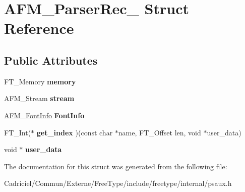 \hypertarget{struct_a_f_m___parser_rec__}{\section{A\-F\-M\-\_\-\-Parser\-Rec\-\_\- Struct Reference}
\label{struct_a_f_m___parser_rec__}
}
\subsection*{Public Attributes}
\begin{DoxyCompactItemize}
\item 
\hypertarget{struct_a_f_m___parser_rec___a3fec8b1760fa9261f48ee87dc2b3858b}{F\-T\-\_\-\-Memory {\bfseries memory}}\label{struct_a_f_m___parser_rec___a3fec8b1760fa9261f48ee87dc2b3858b}

\item 
\hypertarget{struct_a_f_m___parser_rec___adf3b1165216cbd1f7ec7ae736fd4270a}{A\-F\-M\-\_\-\-Stream {\bfseries stream}}\label{struct_a_f_m___parser_rec___adf3b1165216cbd1f7ec7ae736fd4270a}

\item 
\hypertarget{struct_a_f_m___parser_rec___ae53d6cddac32a0eb7014c3a9f74517df}{\hyperlink{struct_a_f_m___font_info_rec__}{A\-F\-M\-\_\-\-Font\-Info} {\bfseries Font\-Info}}\label{struct_a_f_m___parser_rec___ae53d6cddac32a0eb7014c3a9f74517df}

\item 
\hypertarget{struct_a_f_m___parser_rec___a5f93c5c83d0957c19d3827071d90926f}{F\-T\-\_\-\-Int($\ast$ {\bfseries get\-\_\-index} )(const char $\ast$name, F\-T\-\_\-\-Offset len, void $\ast$user\-\_\-data)}\label{struct_a_f_m___parser_rec___a5f93c5c83d0957c19d3827071d90926f}

\item 
\hypertarget{struct_a_f_m___parser_rec___a9fa78a781737bf27e00448c5092b7657}{void $\ast$ {\bfseries user\-\_\-data}}\label{struct_a_f_m___parser_rec___a9fa78a781737bf27e00448c5092b7657}

\end{DoxyCompactItemize}


The documentation for this struct was generated from the following file\-:\begin{DoxyCompactItemize}
\item 
Cadriciel/\-Commun/\-Externe/\-Free\-Type/include/freetype/internal/psaux.\-h\end{DoxyCompactItemize}
